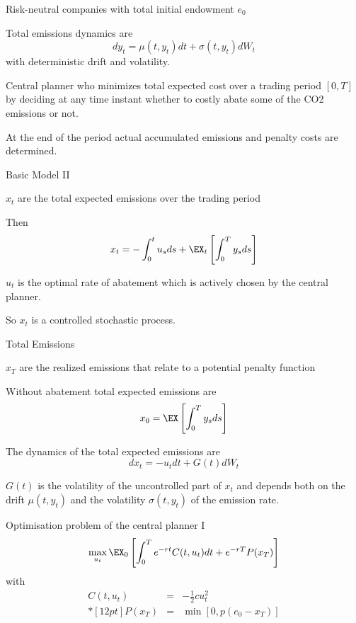 
	Risk-neutral companies with total initial endowment $e_0$

	Total emissions dynamics are
\begin{equation}
dy_t= \mu(t, y_t)dt + \sigma(t, y_t)dW_t
\end{equation}
with deterministic drift and volatility.

	Central planner who minimizes total expected cost over a trading period $[0,T]$ by deciding at any time instant
whether to costly abate some of the CO2 emissions or not.

	At the end of the period actual accumulated emissions and penalty costs are determined.


{Basic Model II}


	$x_t$ are the total expected emissions over the trading period

	Then
\begin{equation}
x_t=-\int_0^tu_s ds + \EX_t\left[\int_0^T y_s ds \right]
\end{equation}

	$u_t$ is the optimal rate of abatement which is  actively chosen by the central planner.

	So $x_t$ is a controlled stochastic process.


{Total Emissions}


	$x_T$ are the realized emissions that relate to a potential penalty function

	Without abatement total expected emissions  are
$$
x_0=\EX\left[\int_0^T y_s ds \right]
$$

	The dynamics of the total expected emissions are
\begin{equation}
dx_t=-u_t dt + G(t) dW_t
\end{equation}

	$G(t)$ is the volatility of the uncontrolled part of $x_t$ and depends both on the drift $\mu(t, y_t)$
and the volatility $\sigma(t,y_t)$ of the emission rate.


{Optimisation problem of the central planner I}
\begin{equation}
\max_{u_t} \EX_0\left[\int_0^Te^{-rt}C(t,u_t)dt + e^{-rT}P(x_T)\right]
\end{equation}
with
$$
\begin{array}{lll}
C(t,u_t) &=& - \frac{1}{2}c u_t^2 \\*[12pt]
P(x_T) &=& \min[0,p(e_0-x_T)]
\end{array}
$$

